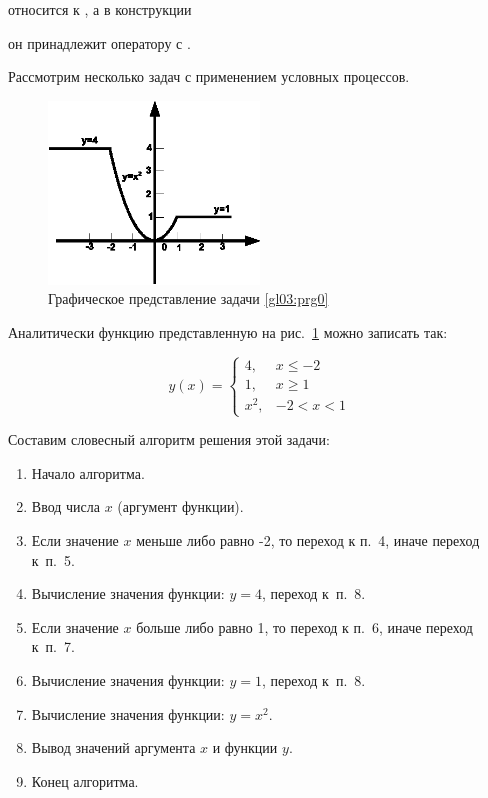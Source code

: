 
 относится к , а в конструкции



он принадлежит оператору  с . 

Рассмотрим несколько задач с применением условных процессов.


\begin{figure}[htb]
\begin{center}
\includegraphics[width=0.5\textwidth]{img/ris_3_10}
\caption{Графическое представление задачи \ref{gl03:prg0}}
\label{ch03:refDrawing9}
\end{center}
\end{figure}

Аналитически функцию представленную на рис.~\ref{ch03:refDrawing9} можно записать так:

\begin{equation*}
y(x)=\left\{\begin{matrix}
4, & x\leqslant -2\\
1, & x\geqslant 1\\
x^2, & -2<x<1
\end{matrix}\right.
\end{equation*}

Составим словесный алгоритм решения этой задачи:

\begin{enumerate}
\item Начало алгоритма.
\item Ввод числа $x$ (аргумент функции).
\item Если значение $x$ меньше либо равно -2, то переход к п.~4, иначе переход к~п.~5.
\item Вычисление значения функции: $y=4$, переход к~п.~8.
\item Если значение $x$ больше либо равно 1, то переход к п.~6, иначе переход к~п.~7.
\item Вычисление значения функции: $y=1$, переход к~п.~8.
\item Вычисление значения функции: $y=x^2$.
\item Вывод значений аргумента $x$ и функции $y$.
\item Конец алгоритма.
\end{enumerate}

